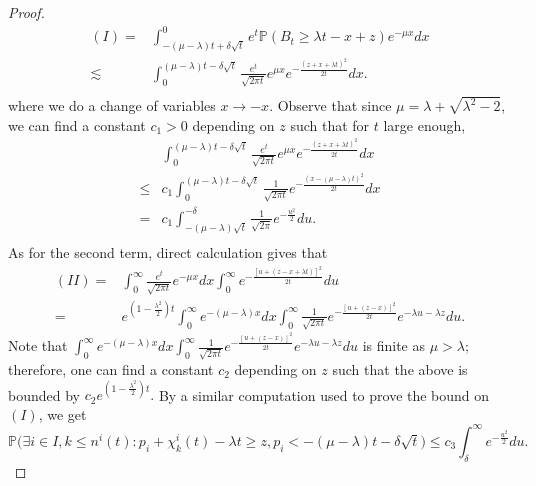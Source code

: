 \documentclass[a4paper,reqno]{amsart}%
\newcommand{\1}{\mathbf 1}
\theoremstyle{mine}
\numberwithin{theorem}{section}
\numberwithin{equation}{section}
\theoremstyle{remark}
\begin{document}
\begin{proof}
\begin{equation}
    \begin{aligned}
      (I)
     =&\int_{-(\mu-\lambda)t+\delta\sqrt{t}}^{0}e^{t}\mathbb{P}(B_{t}\ge \lambda t-x+z)e^{-\mu x}dx\\
\lesssim & \int_{0}^{(\mu-\lambda)t-\delta\sqrt{t}}\frac{e^{t}}{\sqrt{2\pi t}}e^{\mu x}e^{-\frac{(z+x+\lambda t)^{2}}{2t}}dx.\\
    \end{aligned}
  \end{equation}
  where we do a change of variables $x\to -x$. 
  Observe that since $\mu = \lambda + \sqrt{\lambda^2-2}$, we can find a constant $c_{1}>0$ depending on $z$ such that for  $t$ large enough,
  \begin{equation}
    \begin{aligned}
      &\int_{0}^{(\mu-\lambda)t-\delta\sqrt{t}}\frac{e^{t}}{\sqrt{2\pi t}}e^{\mu x}e^{-\frac{(z+x+\lambda t)^{2}}{2t}}dx\\
    \le& c_{1}\int_{0}^{(\mu-\lambda)t-\delta\sqrt{t}}\frac{1}{\sqrt{2\pi t}}e^{-\frac{(x-(\mu -\lambda)t)^{2}}{2t}}dx\\
     = & c_{1}\int_{-(\mu-\lambda)\sqrt{t}}^{-\delta}\frac{1}{\sqrt{2\pi}}e^{-\frac{u^{2}}{2}}du.\\
    \end{aligned}
  \end{equation}
  As for the second term, direct calculation gives that 
  \begin{equation}
    \begin{aligned}
      (II) 
      =&\int_{0}^{\infty}\frac{e^{t}}{\sqrt{2\pi t}}e^{-\mu x}dx\int_{0}^{\infty}e^{-\frac{[u+(z-x+\lambda t)]^{2}}{2t}}du\\
      =&e^{(1-\frac{\lambda^{2}}{2})t}\int_{0}^{\infty}e^{-(\mu-\lambda) x}dx\int_{0}^{\infty}\frac{1}{\sqrt{2\pi t}}e^{-\frac{[u+(z-x)]^{2}}{2t}}e^{-\lambda u-\lambda z}du.
    \end{aligned}
  \end{equation}
Note that $\int_{0}^{\infty}e^{-(\mu-\lambda) x}dx\int_{0}^{\infty}\frac{1}{\sqrt{2\pi t}}e^{-\frac{[u+(z-x)]^{2}}{2t}}e^{-\lambda u-\lambda z}du$ is finite as $\mu > \lambda$; therefore, one can find a constant $c_{2}$ depending on $z$ such that the above is bounded by $ c_{2}e^{(1-\frac{\lambda^{2}}{2})t}.$ 
By a similar computation used to prove the bound on $(I)$, we get
  \begin{equation}
    \mathbb{P}\biggl(\exists i\in I, k \le {n}^{i}(t):p_{i}+\chi^{i}_{k}(t)-\lambda t \ge z, p_{i}<-(\mu - \lambda)t-\delta\sqrt{t}\biggr) \le c_{3}\int_{\delta}^{\infty}e^{-\frac{u^{2}}{2}}du. \label{2.20}

\end{equation}
\end{proof}
\end{document}
